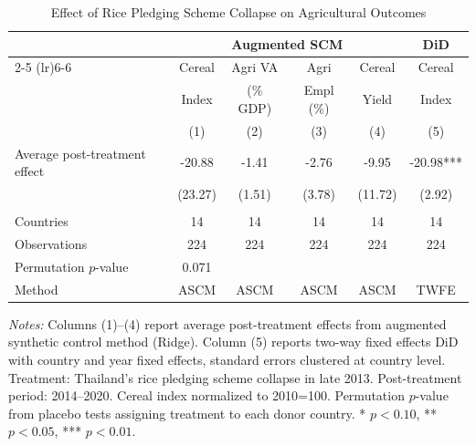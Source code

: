 \begin{table}[htbp]
\centering
\begin{threeparttable}
\caption{Effect of Rice Pledging Scheme Collapse on Agricultural Outcomes}
\label{tab:main}
\begin{tabular}{lccccc}
\toprule
 & \multicolumn{4}{c}{Augmented SCM} & DiD \\
 \cmidrule(lr){2-5} \cmidrule(lr){6-6}
 & Cereal & Agri VA & Agri & Cereal & Cereal \\
 & Index & (\% GDP) & Empl (\%) & Yield & Index \\
 & (1) & (2) & (3) & (4) & (5) \\
\midrule
  Average post-treatment effect & -20.88 & -1.41 & -2.76 & -9.95 & -20.98*** \\
  & (23.27) & (1.51) & (3.78) & (11.72) & (2.92) \\
 & & & & & \\
  Countries & 14 & 14 & 14 & 14 & 14 \\
  Observations & 224 & 224 & 224 & 224 & 224 \\
  Permutation $p$-value & 0.071 & & & & \\
  Method & ASCM & ASCM & ASCM & ASCM & TWFE \\
\bottomrule
\end{tabular}
\begin{tablenotes}[flushleft]\footnotesize
\item \textit{Notes:} Columns (1)--(4) report average post-treatment effects from augmented synthetic control method (Ridge). Column (5) reports two-way fixed effects DiD with country and year fixed effects, standard errors clustered at country level. Treatment: Thailand's rice pledging scheme collapse in late 2013. Post-treatment period: 2014--2020. Cereal index normalized to 2010=100. Permutation $p$-value from placebo tests assigning treatment to each donor country. * $p<0.10$, ** $p<0.05$, *** $p<0.01$.
\end{tablenotes}
\end{threeparttable}
\end{table}
